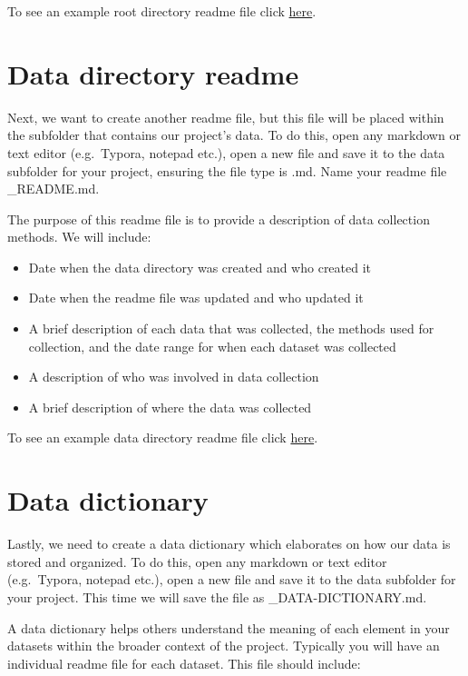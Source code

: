 \documentclass[
]{book}
\providecommand{\tightlist}{%
  \setlength{\itemsep}{0pt}\setlength{\parskip}{0pt}}
\begin{document}
To see an example root directory readme file click \href{files/DS_rootREADME.md}{here}.

\hypertarget{data-directory-readme}{%
\section{Data directory readme}\label{data-directory-readme}}

Next, we want to create another readme file, but this file will be placed within the subfolder that contains our project's data. To do this, open any markdown or text editor (e.g.~Typora, notepad etc.), open a new file and save it to the data subfolder for your project, ensuring the file type is .md. Name your readme file \_README.md.

The purpose of this readme file is to provide a description of data collection methods. We will include:

\begin{itemize}
\tightlist
\item
  Date when the data directory was created and who created it
\item
  Date when the readme file was updated and who updated it
\item
  A brief description of each data that was collected, the methods used for collection, and the date range for when each dataset was collected
\item
  A description of who was involved in data collection
\item
  A brief description of where the data was collected
\end{itemize}

To see an example data directory readme file click \href{files/DS_dataREADME.md}{here}.

\hypertarget{data-dictionary}{%
\section{Data dictionary}\label{data-dictionary}}

Lastly, we need to create a data dictionary which elaborates on how our data is stored and organized. To do this, open any markdown or text editor (e.g.~Typora, notepad etc.), open a new file and save it to the data subfolder for your project. This time we will save the file as \_DATA-DICTIONARY.md.

A data dictionary helps others understand the meaning of each element in your datasets within the broader context of the project. Typically you will have an individual readme file for each dataset. This file should include:
\end{document}
